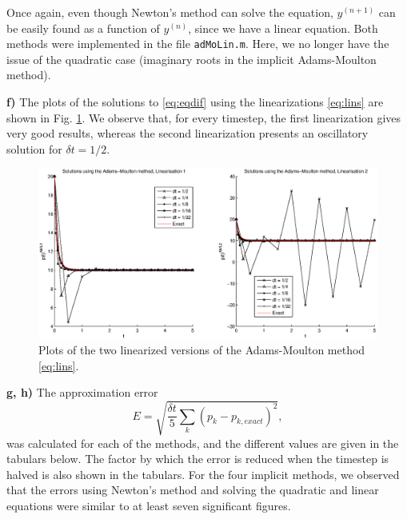 \documentclass[a4paper,10pt]{article}
\begin{document}
Once again, even though Newton's method can solve the equation, $y^{(n+1)}$ can be easily found as a function of $y^{(n)}$, since we have a linear equation. Both methods were implemented in the file \texttt{adMoLin.m}. Here, we no longer have the issue of the quadratic case (imaginary roots in the implicit Adams-Moulton method).

\vspace{3mm}

\textbf{f) } The plots of the solutions to \eqref{eq:eqdif} using the linearizations \eqref{eq:lins} are shown in Fig. \ref{AMLFig}. We observe that, for every timestep, the first linearization gives very good results, whereas the second linearization presents an oscillatory solution for $\delta t = 1/2$.

\begin{figure}[H]%
\centering
\includegraphics[width=1\columnwidth]{AMLGraph.eps}%
\caption{Plots of the two linearized versions of the Adams-Moulton method \eqref{eq:lins}.}%
\label{AMLFig}%
\end{figure}

\vspace{3mm}

\textbf{g, h)} The approximation error
\begin{equation}
E = \sqrt{\frac{\delta t}{5}\sum_{k}(p_k-p_{k,exact})^2},
\label{eq:Error}
\end{equation}
was calculated for each of the methods, and the different values are given in the tabulars below. The factor by which the error is reduced when the timestep is halved is also shown in the tabulars. For the four implicit methods, we observed that the errors using Newton's method and solving the quadratic and linear equations were similar to at least seven significant figures.

\vspace{3mm}
\end{document}
